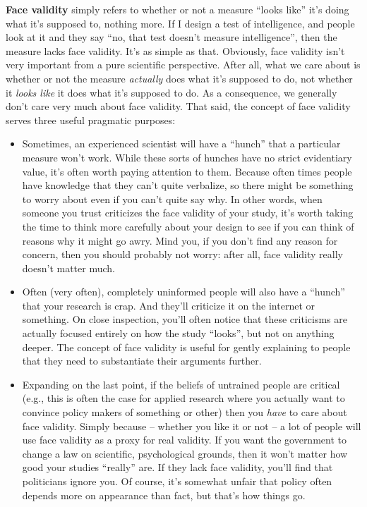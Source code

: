 \documentclass[
]{book}
\begin{document}
\textbf{Face validity} simply refers to whether or not a measure ``looks like'' it's doing what it's supposed to, nothing more. If I design a test of intelligence, and people look at it and they say ``no, that test doesn't measure intelligence'', then the measure lacks face validity. It's as simple as that. Obviously, face validity isn't very important from a pure scientific perspective. After all, what we care about is whether or not the measure {\emph{actually}} does what it's supposed to do, not whether it {\emph{looks like}} it does what it's supposed to do. As a consequence, we generally don't care very much about face validity. That said, the concept of face validity serves three useful pragmatic purposes:

\begin{itemize}
\item
  Sometimes, an experienced scientist will have a ``hunch'' that a particular measure won't work. While these sorts of hunches have no strict evidentiary value, it's often worth paying attention to them. Because often times people have knowledge that they can't quite verbalize, so there might be something to worry about even if you can't quite say why. In other words, when someone you trust criticizes the face validity of your study, it's worth taking the time to think more carefully about your design to see if you can think of reasons why it might go awry. Mind you, if you don't find any reason for concern, then you should probably not worry: after all, face validity really doesn't matter much.
\item
  Often (very often), completely uninformed people will also have a ``hunch'' that your research is crap. And they'll criticize it on the internet or something. On close inspection, you'll often notice that these criticisms are actually focused entirely on how the study ``looks'', but not on anything deeper. The concept of face validity is useful for gently explaining to people that they need to substantiate their arguments further.
\item
  Expanding on the last point, if the beliefs of untrained people are critical (e.g., this is often the case for applied research where you actually want to convince policy makers of something or other) then you {\emph{have}} to care about face validity. Simply because -- whether you like it or not -- a lot of people will use face validity as a proxy for real validity. If you want the government to change a law on scientific, psychological grounds, then it won't matter how good your studies ``really'' are. If they lack face validity, you'll find that politicians ignore you. Of course, it's somewhat unfair that policy often depends more on appearance than fact, but that's how things go.
\end{itemize}
\end{document}
